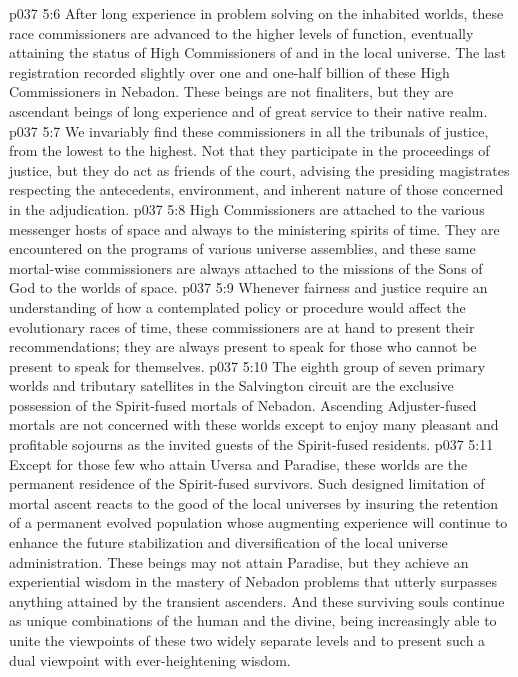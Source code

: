 \vs p037 5:6 After long experience in problem solving on the inhabited worlds, these race commissioners are advanced to the higher levels of function, eventually attaining the status of High Commissioners of and in the local universe. The last registration recorded slightly over one and one\hyp{}half billion of these High Commissioners in Nebadon. These beings are not finaliters, but they are ascendant beings of long experience and of great service to their native realm.
\vs p037 5:7 We invariably find these commissioners in all the tribunals of justice, from the lowest to the highest. Not that they participate in the proceedings of justice, but they do act as friends of the court, advising the presiding magistrates respecting the antecedents, environment, and inherent nature of those concerned in the adjudication.
\vs p037 5:8 High Commissioners are attached to the various messenger hosts of space and always to the ministering spirits of time. They are encountered on the programs of various universe assemblies, and these same mortal\hyp{}wise commissioners are always attached to the missions of the Sons of God to the worlds of space.
\vs p037 5:9 Whenever fairness and justice require an understanding of how a contemplated policy or procedure would affect the evolutionary races of time, these commissioners are at hand to present their recommendations; they are always present to speak for those who cannot be present to speak for themselves.
\pc \vs p037 5:10  The eighth group of seven primary worlds and tributary satellites in the Salvington circuit are the exclusive possession of the Spirit\hyp{}fused mortals of Nebadon. Ascending Adjuster\hyp{}fused mortals are not concerned with these worlds except to enjoy many pleasant and profitable sojourns as the invited guests of the Spirit\hyp{}fused residents.
\vs p037 5:11 Except for those few who attain Uversa and Paradise, these worlds are the permanent residence of the Spirit\hyp{}fused survivors. Such designed limitation of mortal ascent reacts to the good of the local universes by insuring the retention of a permanent evolved population whose augmenting experience will continue to enhance the future stabilization and diversification of the local universe administration. These beings may not attain Paradise, but they achieve an experiential wisdom in the mastery of Nebadon problems that utterly surpasses anything attained by the transient ascenders. And these surviving souls continue as unique combinations of the human and the divine, being increasingly able to unite the viewpoints of these two widely separate levels and to present such a dual viewpoint with ever\hyp{}heightening wisdom.
